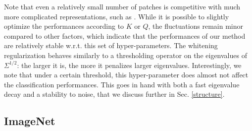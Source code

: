 \documentclass{article} %
\begin{document}
Note that even a relatively small number of patches is competitive with much more complicated representations, such as \citet{Oyallon_2015_CVPR}.
While it is possible to slightly optimize the performances according to $K$ or $Q$,  the fluctuations remain minor compared to other factors, which indicate that the performances of our method are relatively stable w.r.t. this set of hyper-parameters. The whitening regularization behaves similarly to a thresholding operator on the eigenvalues of $\Sigma^{1/2}$: the larger it is, the more it penalizes larger eigenvalues. Interestingly, we note that under a certain threshold, this hyper-parameter  does almost not affect the classification performances. This goes in hand with both a fast eigenvalue decay and a stability to noise, that we discuss further in Sec. \ref{structure}.




\subsection{ImageNet}
\end{document}
